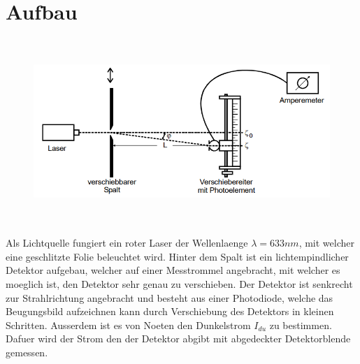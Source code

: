 \section{Aufbau}
\begin{figure}[H]
    \centering
    \captionsetup{justification=centering}
    \includegraphics[height=7cm]{"Aufbau_BeugungSpalt.png"}
    \label{Fig:Aufbau}
\end{figure}
Als Lichtquelle fungiert ein roter Laser der Wellenlaenge $\lambda=633nm$, mit welcher eine geschlitzte Folie beleuchtet wird. Hinter dem Spalt ist ein lichtempindlicher Detektor aufgebau, welcher auf einer Messtrommel angebracht, mit welcher es moeglich ist, den Detektor sehr genau zu verschieben. Der Detektor ist senkrecht zur Strahlrichtung angebracht und besteht aus einer Photodiode, welche das Beugungsbild aufzeichnen kann durch Verschiebung des Detektors in kleinen Schritten. Ausserdem ist es von Noeten den Dunkelstrom $I_{du}$ zu bestimmen. Dafuer wird der Strom den der Detektor abgibt mit abgedeckter Detektorblende gemessen.
